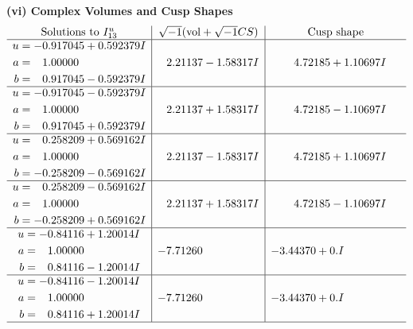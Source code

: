 \documentclass[1p]{elsarticle_modified}
\theoremstyle{definition}
\newcommand{\I}{\sqrt{-1}}
\begin{document}
\newpage\flushleft \textbf{(vi) Complex Volumes and Cusp Shapes}
$$\begin{array}{c|c|c}  
\text{Solutions to }I^u_{13}& \I (\text{vol} + \sqrt{-1}CS) & \text{Cusp shape}\\
 \hline 
\begin{aligned}
u &= -0.917045 + 0.592379 I \\
a &= \phantom{-}1.00000\phantom{ +0.000000I} \\
b &= \phantom{-}0.917045 - 0.592379 I\end{aligned}
 & \phantom{-}2.21137 - 1.58317 I & \phantom{-}4.72185 + 1.10697 I \\ \hline\begin{aligned}
u &= -0.917045 - 0.592379 I \\
a &= \phantom{-}1.00000\phantom{ +0.000000I} \\
b &= \phantom{-}0.917045 + 0.592379 I\end{aligned}
 & \phantom{-}2.21137 + 1.58317 I & \phantom{-}4.72185 - 1.10697 I \\ \hline\begin{aligned}
u &= \phantom{-}0.258209 + 0.569162 I \\
a &= \phantom{-}1.00000\phantom{ +0.000000I} \\
b &= -0.258209 - 0.569162 I\end{aligned}
 & \phantom{-}2.21137 - 1.58317 I & \phantom{-}4.72185 + 1.10697 I \\ \hline\begin{aligned}
u &= \phantom{-}0.258209 - 0.569162 I \\
a &= \phantom{-}1.00000\phantom{ +0.000000I} \\
b &= -0.258209 + 0.569162 I\end{aligned}
 & \phantom{-}2.21137 + 1.58317 I & \phantom{-}4.72185 - 1.10697 I \\ \hline\begin{aligned}
u &= -0.84116 + 1.20014 I \\
a &= \phantom{-}1.00000\phantom{ +0.000000I} \\
b &= \phantom{-}0.84116 - 1.20014 I\end{aligned}
 & -7.71260\phantom{ +0.000000I} & -3.44370 + 0. I\phantom{ +0.000000I} \\ \hline\begin{aligned}
u &= -0.84116 - 1.20014 I \\
a &= \phantom{-}1.00000\phantom{ +0.000000I} \\
b &= \phantom{-}0.84116 + 1.20014 I\end{aligned}
 & -7.71260\phantom{ +0.000000I} & -3.44370 + 0. I\phantom{ +0.000000I}\\
 \hline 
 \end{array}$$\newpage\newpage\renewcommand{\arraystretch}{1}
\end{document}
